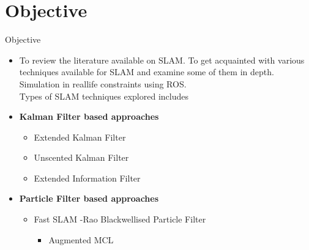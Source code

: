 \documentclass{beamer}
\begin{document}
\section{Objective}
\begin{frame}{Objective}
    \begin{itemize}
        \item To review the literature available on SLAM. To get acquainted with various techniques available for SLAM and examine some of them in depth. Simulation in reallife constraints using ROS.\\
            Types of SLAM techniques explored includes
        \item \textbf{Kalman Filter based approaches}
            \begin{itemize}
                \item Extended Kalman Filter
                \item Unscented Kalman Filter
                \item Extended Information Filter
            \end{itemize}
            \item \textbf{Particle Filter based approaches}
                \begin{itemize}
                    \item Fast SLAM -Rao Blackwellised Particle Filter
                        \begin{itemize}
                            \item Augmented MCL
                        \end{itemize}
                \end{itemize}
       \end{itemize}
\vfill
\end{frame}
\end{document}
